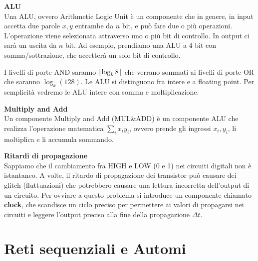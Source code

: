 \begin{defn}
	\textbf{ALU} \\

	Una ALU, ovvero Arithmetic Logic Unit è un componente che in genere, in
	input accetta due parole $ x,y $ entrambe da $ n $ bit, e può fare due o più
	operazioni. L'operazione viene selezionata attraverso uno o più bit di
	controllo. In output ci sarà un uscita da $ n $ bit. Ad esempio, prendiamo
	una ALU a 4 bit con somma/sottrazione, che accetterà un solo bit di
	controllo.

	
	I livelli di porte AND saranno $ \lceil\log_k8\rceil $ che verrano sommati ai
	livelli di porte OR che saranno $ \log_k(128) $. Le ALU si distinguono fra
	intere e a floating point. Per semplicità vedremo le ALU intere con somma e
	moltiplicazione.

\end{defn}

\begin{defn}
	\textbf{Multiply and Add} \\

	Un componente Multiply and Add (MUL\&ADD) è un componente ALU che realizza
	l'operazione matematica $ \sum_{i}x_iy_i $, ovvero prende gli ingressi $
	x_i,y_i $, li moltiplica e li accumula sommando.

\end{defn}

\begin{defn}
	\textbf{Ritardi di propagazione} \\
	Sappiamo che il cambiamento fra HIGH e LOW (0 e 1) nei circuiti digitali non
	è istantaneo. A volte, il ritardo di propagazione dei transistor può causare
	dei glitch (fluttuazioni) che potrebbero causare una lettura incorretta
	dell'output di un circuito. Per ovviare a questo problema si introduce un
	componente chiamato \textbf{clock}, che scandisce un ciclo preciso per
	permettere ai valori di propagarsi nei circuiti e leggere l'output preciso
	alla fine della propagazione $ \Delta t $.
\end{defn}

\section{Reti sequenziali e Automi}

